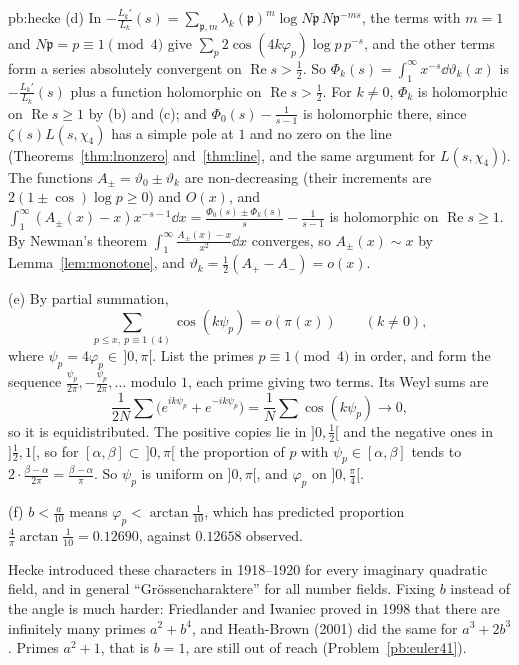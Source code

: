 \begin{solution}{pb:hecke}
(d) In $-\frac{L_k'}{L_k}(s)=\sum_{\mathfrak p,m}\lambda_k(\mathfrak p)^m\log N\mathfrak p\,N\mathfrak p^{-ms}$, the terms with $m=1$ and $N\mathfrak p=p\equiv1\pmod4$ give $\sum_p2\cos(4k\varphi_p)\log p\,p^{-s}$,
and the other terms form a series absolutely convergent on $\operatorname{Re}s>\frac12$. So $\Phi_k(s)=\int_1^\infty x^{-s}\dd\vartheta_k(x)$ is $-\frac{L_k'}{L_k}(s)$ plus a function holomorphic on
$\operatorname{Re}s>\frac12$. For $k\ne0$, $\Phi_k$ is holomorphic on $\operatorname{Re}s\ge1$ by (b) and (c); and $\Phi_0(s)-\frac1{s-1}$ is holomorphic there, since $\zeta(s)L(s,\chi_4)$ has a
simple pole at $1$ and no zero on the line (Theorems~\ref{thm:lnonzero} and~\ref{thm:line}, and the same argument for $L(s,\chi_4)$). The functions $A_\pm=\vartheta_0\pm\vartheta_k$ are
non-decreasing (their increments are $2(1\pm\cos)\log p\ge0$) and $O(x)$, and $\int_1^\infty(A_\pm(x)-x)x^{-s-1}\dd x=\frac{\Phi_0(s)\pm\Phi_k(s)}s-\frac1{s-1}$ is holomorphic on
$\operatorname{Re}s\ge1$. By Newman's theorem $\int_1^\infty\frac{A_\pm(x)-x}{x^2}\dd x$ converges, so $A_\pm(x)\sim x$ by Lemma~\ref{lem:monotone}, and $\vartheta_k=\frac12(A_+-A_-)=o(x)$.

(e) By partial summation,
\[
\sum_{p\le x,\ p\equiv1\,(4)}\cos(k\psi_p)=o(\pi(x))\qquad(k\ne0),
\]
where $\psi_p=4\varphi_p\in\,]0,\pi[$. List the primes $p\equiv1\pmod4$ in order, and form the
sequence $\frac{\psi_{p}}{2\pi},-\frac{\psi_{p}}{2\pi},\dots$ modulo $1$, each prime giving two terms. Its Weyl sums are
\[
\frac1{2N}\sum\bigl(e^{ik\psi_p}+e^{-ik\psi_p}\bigr)=\frac1N\sum\cos(k\psi_p)\to0,
\]
so it is equidistributed. The positive copies lie in $]0,\frac12[$ and the negative ones in $]\frac12,1[$, so for $[\alpha,\beta]\subset\,]0,\pi[$ the proportion of $p$ with
$\psi_p\in[\alpha,\beta]$ tends to $2\cdot\frac{\beta-\alpha}{2\pi}=\frac{\beta-\alpha}\pi$. So $\psi_p$ is uniform on $]0,\pi[$, and $\varphi_p$ on $]0,\frac\pi4[$.

(f) $b<\frac a{10}$ means $\varphi_p<\arctan\frac1{10}$, which has predicted proportion $\frac4\pi\arctan\frac1{10}=0.12690$, against $0.12658$ observed.


\leads Hecke introduced these characters in 1918--1920 for every imaginary quadratic field, and in general ``Grössencharaktere'' for all number fields. Fixing $b$ instead of the angle is
much harder: Friedlander and Iwaniec proved in 1998 that there are infinitely many primes $a^2+b^4$, and Heath-Brown (2001) did the same for $a^3+2b^3$. Primes $a^2+1$, that
is $b=1$, are still out of reach (Problem~\ref{pb:euler41}).
\end{solution}

